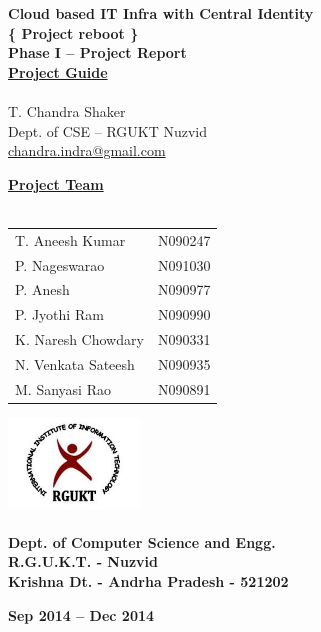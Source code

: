 \documentclass[12pt]{report}
\begin{document}
\begin{titlepage}
 \begin{center}
\LARGE
\textbf{Cloud based IT Infra with Central Identity} \\
\vfill
\large
\textbf{\{ Project reboot \}}\\
\vfill
\textbf{Phase I -- Project Report }\\
\vfill
\Large
\underline{\textbf{Project Guide }} \\ 
\large
\underline{} \\
T. Chandra Shaker \\
\small
Dept. of CSE -- RGUKT Nuzvid \\
\small
\url{chandra.indra@gmail.com}
\vfill

\Large
\textbf{\underline{ Project Team } } \\
\underline{} \\
\large
\begin{tabular}{l  l}
T. Aneesh Kumar & N090247  \\
P. Nageswarao  & N091030  \\
P. Anesh  & N090977  \\
P. Jyothi Ram & N090990  \\
K. Naresh Chowdary  & N090331  \\
N. Venkata Sateesh  & N090935  \\
M. Sanyasi Rao & N090891 
\end{tabular}

\vfill


\includegraphics[width=3.5cm]{rgukt_logo.jpg} 
\Large
\underline{} \\
\underline{} \\
\normalsize
\textbf{Dept. of Computer Science and Engg. } \\
\textbf{R.G.U.K.T. - Nuzvid } \\
\textbf{Krishna Dt. - Andrha Pradesh - 521202}


\normalsize
\vfill
%
%

\textbf{Sep 2014 -- Dec 2014 }

\end{center}
\end{titlepage}
\end{document}
